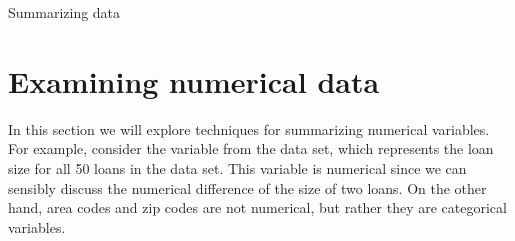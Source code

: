 \begin{chapterpage}{Summarizing data}
  \label{summarizingData}
  \label{ch_summarizing_data}
\end{chapterpage}
\renewcommand{\chapterfolder}{ch_summarizing_data}




\section{Examining numerical data}
\label{numericalData}

\newcommand{\loanA}{10.90}
\newcommand{\loanB}{9.92}
\newcommand{\loanC}{26.30}
\newcommand{\loanD}{9.92}
\newcommand{\loanY}{9.43}
\newcommand{\loanZ}{6.08}
\newcommand{\loanAvg}{11.57}
\newcommand{\loanVar}{25.52}
\newcommand{\loanSD}{5.05}
\newcommand{\loanN}{50}
\newcommand{\loanMedianBelow}{9.93\%}
\newcommand{\loanMedianAbove}{9.93\%}
\newcommand{\loanMedian}{9.93\%}
\newcommand{\loanQA}{7.96}
\newcommand{\loanQC}{13.72}
\newcommand{\loanIQR}{5.76}
\newcommand{\loanAdev}{-0.67}
\newcommand{\loanBdev}{-1.65}
\newcommand{\loanCdev}{14.73}
\newcommand{\loanDdev}{-1.65}
\newcommand{\loanYdev}{-2.14}
\newcommand{\loanZdev}{-5.49}
\newcommand{\loanSmallestValue}{5.31}
\newcommand{\loanLargestValue}{26.30}


In this section we will explore techniques for
summarizing numerical variables.
For example, consider the  variable
from the  data set, which represents the loan
size for all 50 loans in the data set.
This variable is numerical since we can sensibly discuss
the numerical difference of the size of two loans.
On the other hand, area codes and zip codes are not numerical,
but rather they are categorical variables.


